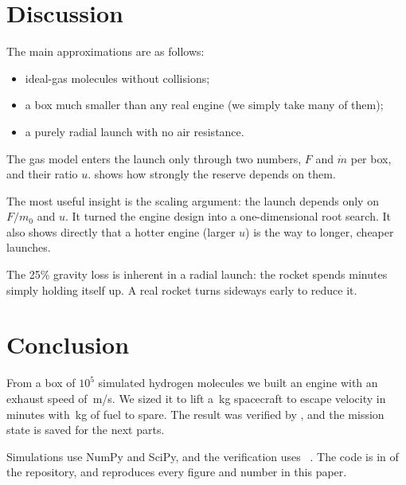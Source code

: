 \documentclass[aps,prd,twocolumn,nofootinbib,floatfix,superscriptaddress]{revtex4-2}
\begin{document}

\section{Discussion}
The main approximations are as follows:
\begin{itemize}
\item ideal-gas molecules without collisions;
\item a box much smaller than any real engine (we simply take many of them);
\item a purely radial launch with no air resistance.
\end{itemize}
The gas model enters the launch only through two numbers, $F$ and $\dot m$ per box, and their ratio $u$.
 shows how strongly the reserve depends on them.

The most useful insight is the scaling argument: the launch depends only on $F/m_0$ and $u$.
It turned the engine design into a one-dimensional root search.
It also shows directly that a hotter engine (larger $u$) is the way to longer, cheaper launches.

The 25\% gravity loss is inherent in a radial launch: the rocket spends minutes simply holding itself up.
A real rocket turns sideways early to reduce it.

\section{Conclusion}
From a box of $10^5$ simulated hydrogen molecules we built an engine with an exhaust speed of \,m/s.
We sized it to lift a \,kg spacecraft to escape velocity in  minutes with \,kg of fuel to spare.
The result was verified by , and the mission state is saved for the next parts.

\begin{acknowledgments}
Simulations use NumPy and SciPy, and the verification uses ~\cite{ast2000tools}.
The code is in  of the repository, and  reproduces every figure and number in this paper.
\end{acknowledgments}
\end{document}
